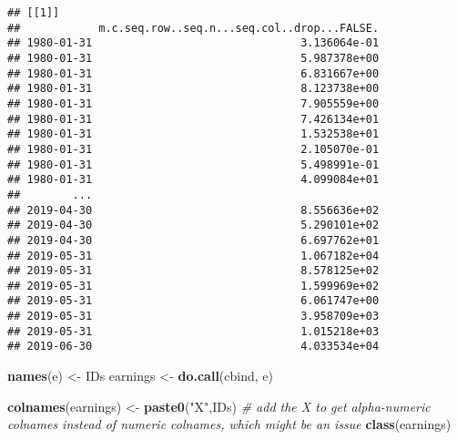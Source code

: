 \documentclass[
]{article}
\newenvironment{Shaded}{\begin{snugshade}}{\end{snugshade}}
\newcommand{\AttributeTok}[1]{\textcolor[rgb]{0.13,0.29,0.53}{#1}}
\newcommand{\CommentTok}[1]{\textcolor[rgb]{0.56,0.35,0.01}{\textit{#1}}}
\newcommand{\ControlFlowTok}[1]{\textcolor[rgb]{0.13,0.29,0.53}{\textbf{#1}}}
\newcommand{\DecValTok}[1]{\textcolor[rgb]{0.00,0.00,0.81}{#1}}
\newcommand{\FunctionTok}[1]{\textcolor[rgb]{0.13,0.29,0.53}{\textbf{#1}}}
\newcommand{\NormalTok}[1]{#1}
\newcommand{\OtherTok}[1]{\textcolor[rgb]{0.56,0.35,0.01}{#1}}
\newcommand{\SpecialCharTok}[1]{\textcolor[rgb]{0.81,0.36,0.00}{\textbf{#1}}}
\newcommand{\StringTok}[1]{\textcolor[rgb]{0.31,0.60,0.02}{#1}}
\begin{document}
\begin{Shaded}
\end{Shaded}

\begin{verbatim}
## [[1]]
##            m.c.seq.row..seq.n...seq.col..drop...FALSE.
## 1980-01-31                                3.136064e-01
## 1980-01-31                                5.987378e+00
## 1980-01-31                                6.831667e+00
## 1980-01-31                                8.123738e+00
## 1980-01-31                                7.905559e+00
## 1980-01-31                                7.426134e+01
## 1980-01-31                                1.532538e+01
## 1980-01-31                                2.105070e-01
## 1980-01-31                                5.498991e-01
## 1980-01-31                                4.099084e+01
##        ...                                            
## 2019-04-30                                8.556636e+02
## 2019-04-30                                5.290101e+02
## 2019-04-30                                6.697762e+01
## 2019-05-31                                1.067182e+04
## 2019-05-31                                8.578125e+02
## 2019-05-31                                1.599969e+02
## 2019-05-31                                6.061747e+00
## 2019-05-31                                3.958709e+03
## 2019-05-31                                1.015218e+03
## 2019-06-30                                4.033534e+04
\end{verbatim}

\begin{Shaded}
\begin{Highlighting}[]
\FunctionTok{names}\NormalTok{(e) }\OtherTok{\textless{}{-}}\NormalTok{ IDs}
\NormalTok{earnings }\OtherTok{\textless{}{-}} \FunctionTok{do.call}\NormalTok{(cbind, e)}

\FunctionTok{colnames}\NormalTok{(earnings) }\OtherTok{\textless{}{-}} \FunctionTok{paste0}\NormalTok{(}\StringTok{"X"}\NormalTok{,IDs) }\CommentTok{\# add the X to get alpha{-}numeric colnames instead of numeric colnames, which might be an issue}
\FunctionTok{class}\NormalTok{(earnings)}
\end{Highlighting}
\end{Shaded}
\end{document}
